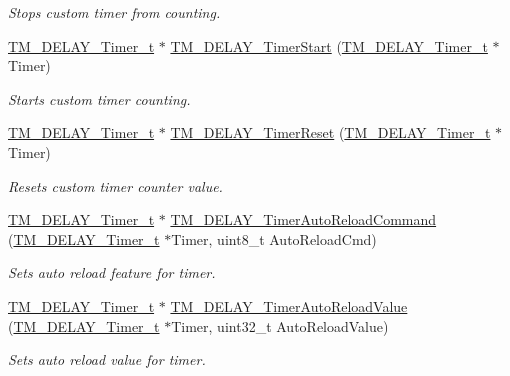 \begin{DoxyCompactItemize}
\begin{DoxyCompactList}\small\item\em Stops custom timer from counting. \end{DoxyCompactList}\item 
\hyperlink{group___t_m___d_e_l_a_y___typedefs_gaf0beeb077a757f34c8b176464d9a0e85}{T\+M\+\_\+\+D\+E\+L\+A\+Y\+\_\+\+Timer\+\_\+t} $\ast$ \hyperlink{group___t_m___d_e_l_a_y___timer___functions_ga3d811bc37a1b9f975ba3738f577021dc}{T\+M\+\_\+\+D\+E\+L\+A\+Y\+\_\+\+Timer\+Start} (\hyperlink{group___t_m___d_e_l_a_y___typedefs_gaf0beeb077a757f34c8b176464d9a0e85}{T\+M\+\_\+\+D\+E\+L\+A\+Y\+\_\+\+Timer\+\_\+t} $\ast$Timer)
\begin{DoxyCompactList}\small\item\em Starts custom timer counting. \end{DoxyCompactList}\item 
\hyperlink{group___t_m___d_e_l_a_y___typedefs_gaf0beeb077a757f34c8b176464d9a0e85}{T\+M\+\_\+\+D\+E\+L\+A\+Y\+\_\+\+Timer\+\_\+t} $\ast$ \hyperlink{group___t_m___d_e_l_a_y___timer___functions_ga0817b5f2921d7e9b0efc9ea97a38a621}{T\+M\+\_\+\+D\+E\+L\+A\+Y\+\_\+\+Timer\+Reset} (\hyperlink{group___t_m___d_e_l_a_y___typedefs_gaf0beeb077a757f34c8b176464d9a0e85}{T\+M\+\_\+\+D\+E\+L\+A\+Y\+\_\+\+Timer\+\_\+t} $\ast$Timer)
\begin{DoxyCompactList}\small\item\em Resets custom timer counter value. \end{DoxyCompactList}\item 
\hyperlink{group___t_m___d_e_l_a_y___typedefs_gaf0beeb077a757f34c8b176464d9a0e85}{T\+M\+\_\+\+D\+E\+L\+A\+Y\+\_\+\+Timer\+\_\+t} $\ast$ \hyperlink{group___t_m___d_e_l_a_y___timer___functions_ga4a62180a12d19b372b3da3d98898d9d3}{T\+M\+\_\+\+D\+E\+L\+A\+Y\+\_\+\+Timer\+Auto\+Reload\+Command} (\hyperlink{group___t_m___d_e_l_a_y___typedefs_gaf0beeb077a757f34c8b176464d9a0e85}{T\+M\+\_\+\+D\+E\+L\+A\+Y\+\_\+\+Timer\+\_\+t} $\ast$Timer, uint8\+\_\+t Auto\+Reload\+Cmd)
\begin{DoxyCompactList}\small\item\em Sets auto reload feature for timer. \end{DoxyCompactList}\item 
\hyperlink{group___t_m___d_e_l_a_y___typedefs_gaf0beeb077a757f34c8b176464d9a0e85}{T\+M\+\_\+\+D\+E\+L\+A\+Y\+\_\+\+Timer\+\_\+t} $\ast$ \hyperlink{group___t_m___d_e_l_a_y___timer___functions_gaa9fdfeb8a094bdfec218134cba774b9e}{T\+M\+\_\+\+D\+E\+L\+A\+Y\+\_\+\+Timer\+Auto\+Reload\+Value} (\hyperlink{group___t_m___d_e_l_a_y___typedefs_gaf0beeb077a757f34c8b176464d9a0e85}{T\+M\+\_\+\+D\+E\+L\+A\+Y\+\_\+\+Timer\+\_\+t} $\ast$Timer, uint32\+\_\+t Auto\+Reload\+Value)
\begin{DoxyCompactList}\small\item\em Sets auto reload value for timer. \end{DoxyCompactList}\end{DoxyCompactItemize}



